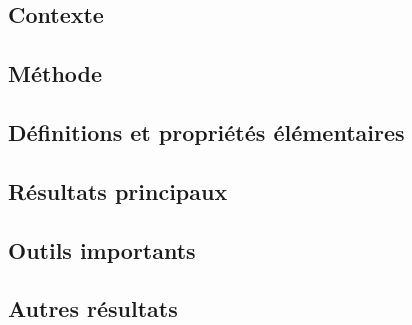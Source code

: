 \documentclass[12pt,a4paper]{article}
\begin{document}
\subsection*{Contexte}

\subsection*{Méthode}

\subsection*{Définitions et propriétés élémentaires}

\subsection*{Résultats principaux}

\subsection*{Outils importants}


\subsection*{Autres résultats}
\end{document}
